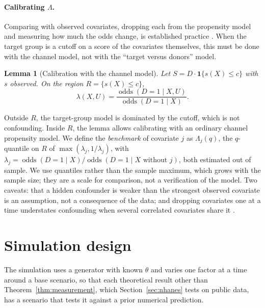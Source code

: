 \documentclass[twoside,11pt]{article}
\newcommand{\ind}{\mathbf{1}}
\newcommand{\odds}{\operatorname{odds}}
\theoremstyle{plain}
\newtheorem{lemma}{Lemma}
\theoremstyle{definition}
\begin{document}
\paragraph{Calibrating $\Lambda$.} Comparing with observed covariates, dropping each from the propensity model and measuring how much the odds change, is established practice \citep{baitairian2025,mcclean2024}. When the target group is a cutoff on a score of the covariates themselves, this must be done with the channel model, not with the ``target versus donors'' model.

\begin{lemma}[Calibration with the channel model]\label{lem:calibration}
Let $S=D\cdot\ind\{s(X)\le c\}$ with $s$ observed. On the region $R=\{s(X)\le c\}$,
\[
\lambda(X,U)=\frac{\odds(D=1\mid X,U)}{\odds(D=1\mid X)}.
\]
\end{lemma}

Outside $R$, the target-group model is dominated by the cutoff, which is not confounding. Inside $R$, the lemma allows calibrating with an ordinary channel propensity model. We define the \emph{benchmark} of covariate $j$ as $\Lambda_j(q)$, the $q$-quantile on $R$ of $\max(\lambda_j,1/\lambda_j)$, with $\lambda_j=\odds(D=1\mid X)/\odds(D=1\mid X\text{ without }j)$, both estimated out of sample. We use quantiles rather than the sample maximum, which grows with the sample size; they are a scale for comparison, not a verification of the model. Two caveats: that a hidden confounder is weaker than the strongest observed covariate is an assumption, not a consequence of the data; and dropping covariates one at a time understates confounding when several correlated covariates share it \citep{mcclean2024}.
\section{Simulation design}\label{sec:design}

The simulation uses a generator with known $\theta$ and varies one factor at a time around a base scenario, so that each theoretical result other than Theorem~\ref{thm:measurement}, which Section~\ref{sec:nhanes} tests on public data, has a scenario that tests it against a prior numerical prediction.
\end{document}
